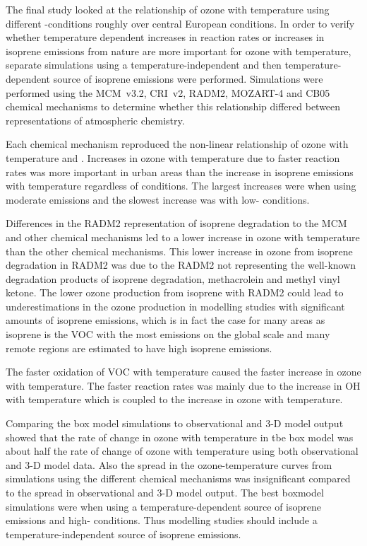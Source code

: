The final study looked at the relationship of ozone with temperature using different -conditions roughly over central European conditions.
In order to verify whether temperature dependent increases in reaction rates or increases in isoprene emissions from nature are more important for ozone with temperature, separate simulations using a temperature-independent and then temperature-dependent source of isoprene emissions were performed.
Simulations were performed using the MCM~v3.2, CRI~v2, RADM2, MOZART-4 and CB05 chemical mechanisms to determine whether this relationship differed between representations of atmospheric chemistry.

Each chemical mechanism reproduced the non-linear relationship of ozone with temperature and .
Increases in ozone with temperature due to faster reaction rates was more important in urban areas than the increase in isoprene emissions with temperature regardless of  conditions.
The largest increases were when using moderate  emissions and the slowest increase was with low- conditions.

Differences in the RADM2 representation of isoprene degradation to the MCM and other chemical mechanisms led to a lower increase in ozone with temperature than the other chemical mechanisms.
This lower increase in ozone from isoprene degradation in RADM2 was due to the RADM2 not representing the well-known degradation products of isoprene degradation, methacrolein and methyl vinyl ketone.
The lower ozone production from isoprene with RADM2 could lead to underestimations in the ozone production in modelling studies with significant amounts of isoprene emissions, which is in fact the case for many areas as isoprene is the VOC with the most emissions on the global scale and many remote regions are estimated to have high isoprene emissions.

The faster oxidation of VOC with temperature caused the faster increase in ozone with temperature.
The faster reaction rates was mainly due to the increase in OH with temperature which is coupled to the increase in ozone with temperature.

Comparing the box model simulations to observational and 3-D model output showed that the rate of change in ozone with temperature in tbe box model was about half the rate of change of ozone with temperature using both observational and 3-D model data.
Also the spread in the ozone-temperature curves from simulations using the different chemical mechanisms was insignificant compared to the spread in observational and 3-D model output.
The best boxmodel simulations were when using a temperature-dependent source of isoprene emissions and high- conditions.
Thus modelling studies should include a temperature-independent source of isoprene emissions.

